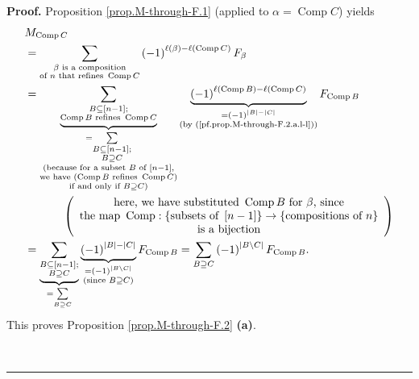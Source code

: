 \documentclass[numbers=enddot,12pt,final,onecolumn,notitlepage]{scrartcl}%
\theoremstyle{definition}
\newenvironment{proof}[1][Proof]{\noindent\textbf{#1.} }{\ \rule{0.5em}{0.5em}}
\newenvironment{verlong}{}{}
\let\sumnonlimits\sum
\renewcommand{\sum}{\sumnonlimits\limits}
\begin{document}
\begin{verlong}
\begin{proof}
Proposition \ref{prop.M-through-F.1} (applied to $\alpha=\operatorname*{Comp}%
C$) yields%
\begin{align*}
& M_{\operatorname*{Comp}C}\\
& =\sum_{\substack{\beta\text{ is a composition}\\\text{of }n\text{ that
refines }\operatorname*{Comp}C}}\left(  -1\right)  ^{\ell\left(  \beta\right)
-\ell\left(  \operatorname*{Comp}C\right)  }F_{\beta}\\
& =\underbrace{\sum_{\substack{B\subseteq\left[  n-1\right]
;\\\operatorname*{Comp}B\text{ refines }\operatorname*{Comp}C}}}%
_{\substack{=\sum_{\substack{B\subseteq\left[  n-1\right]  ;\\B\supseteq
C}}\\\text{(because for a subset }B\text{ of }\left[  n-1\right]
\text{,}\\\text{we have }\left(  \operatorname*{Comp}B\text{ refines
}\operatorname*{Comp}C\right)  \\\text{if and only if }B\supseteq C\text{)}%
}}\underbrace{\left(  -1\right)  ^{\ell\left(  \operatorname*{Comp}B\right)
-\ell\left(  \operatorname*{Comp}C\right)  }}_{\substack{=\left(  -1\right)
^{\left\vert B\right\vert -\left\vert C\right\vert }\\\text{(by
(\ref{pf.prop.M-through-F.2.a.l-l}))}}}F_{\operatorname*{Comp}B}\\
& \ \ \ \ \ \ \ \ \ \ \left(
\begin{array}
[c]{c}%
\text{here, we have substituted }\operatorname*{Comp}B\text{ for }\beta\text{,
since}\\
\text{the map }\operatorname*{Comp}:\left\{  \text{subsets of }\left[
n-1\right]  \right\}  \rightarrow\left\{  \text{compositions of }n\right\}  \\
\text{is a bijection}%
\end{array}
\right)  \\
& =\underbrace{\sum_{\substack{B\subseteq\left[  n-1\right]  ;\\B\supseteq
C}}}_{=\sum_{B\supseteq C}}\underbrace{\left(  -1\right)  ^{\left\vert
B\right\vert -\left\vert C\right\vert }}_{\substack{=\left(  -1\right)
^{\left\vert B\setminus C\right\vert }\\\text{(since }B\supseteq C\text{)}%
}}F_{\operatorname*{Comp}B}=\sum_{B\supseteq C}\left(  -1\right)  ^{\left\vert
B\setminus C\right\vert }F_{\operatorname*{Comp}B}.
\end{align*}
This proves Proposition \ref{prop.M-through-F.2} \textbf{(a)}.


\end{proof}
\end{verlong}
\end{document}
